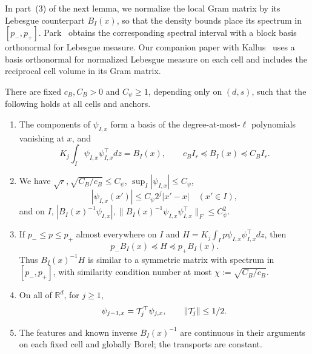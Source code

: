 In part~(3) of the next lemma, we normalize the local Gram matrix by
its Lebesgue counterpart $B_I(x)$, so that the density bounds place its
spectrum in $[p_-,p_+]$. Park~\cite[Section~3.2, equation~(9)]{Park2026} obtains the
corresponding spectral interval with a block basis orthonormal for
Lebesgue measure. Our companion paper with
Kallus~\cite[Section~4.2, proof of Lemma~4.3]{AronowKallusLopatto2026}
uses a basis orthonormal for normalized Lebesgue measure on each cell
and includes the reciprocal cell volume in its Gram matrix.
\begin{lemma}\label{lem:U1}
There are fixed $c_B,C_B>0$ and $C_\psi\ge1$, depending only on
$(d,s)$, such that the following holds at all cells and anchors.
\begin{enumerate}
\item[\textup{(1)}] The components of $\psi_{I,x}$ form a basis of
the degree-at-most-$\ell$ polynomials vanishing at $x$, and
\begin{equation}\label{eq:U1-Gram}
 K_j\int_I\psi_{I,x}\psi_{I,x}^\top dz=B_I(x),
 \qquad c_BI_r\preceq B_I(x)\preceq C_BI_r.
\end{equation}
\item[\textup{(2)}] We have $\sqrt r,\sqrt{C_B/c_B}\le C_\psi$,
$\sup_I|\psi_{I,x}|\le C_\psi$,
\begin{equation}\label{eq:U1-lipschitz}
 |\psi_{I,x}(x')|\le C_\psi2^j|x'-x|\quad(x'\in I),
\end{equation}
and on $I$,
$|B_I(x)^{-1}\psi_{I,x}|,
 \|B_I(x)^{-1}\psi_{I,x}\psi_{I,x}^\top\|_F\le C_\psi^2$.
\item[\textup{(3)}] If $p_-\le p\le p_+$ almost everywhere on $I$ and
$H=K_j\int_Ip\psi_{I,x}\psi_{I,x}^\top dz$, then
\begin{equation}\label{eq:U1-spectrum}
 p_-B_I(x)\preceq H\preceq p_+B_I(x).
\end{equation}
Thus $B_I(x)^{-1}H$ is similar to a symmetric matrix with spectrum
in $[p_-,p_+]$, with similarity condition number at most
$\chi:=\sqrt{C_B/c_B}$.
\item[\textup{(4)}] On all of $\mathbb R^d$, for $j\ge1$,
\begin{equation}\label{eq:U1-transport}
 \psi_{j-1,x}=\mathcal T_j^\top\psi_{j,x},\qquad
 \lVert\mathcal T_j\rVert\le1/2.
\end{equation}
\item[\textup{(5)}] The features and known inverse $B_I(x)^{-1}$
are continuous in their arguments on each fixed cell and globally
Borel; the transports are constant.
\end{enumerate}
\end{lemma}

